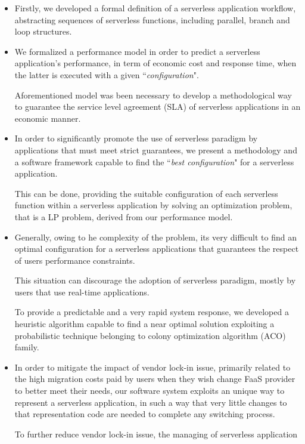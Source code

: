 \documentclass[12pt,a4paper]{report}
\begin{document}
\begin{itemize}
	\item Firstly, we developed a formal definition of a serverless application workflow, abstracting sequences of serverless functions, including parallel, branch and loop structures.
	
	\item We formalized a performance model in order to predict a serverless application's performance, in term of economic cost and response time, when the latter is executed with a given ``\textit{configuration}". 
	
	Aforementioned model was been necessary to develop a methodological way to guarantee the service level agreement (SLA) of serverless applications in an economic manner.
	
	\item In order to significantly promote the use of serverless paradigm by applications that must meet strict guarantees, we present a methodology and a software framework capable to find the ``\textit{best configuration}" for a serverless application.
	
	This can be done, providing the suitable configuration of each serverless function within a serverless application by solving an optimization problem, that is a LP problem, derived from our performance model.
	
	\item Generally, owing to he complexity of the problem, its very difficult to find an optimal configuration for a serverless applications that guarantees the respect of users performance constraints. 
	
	This situation can discourage the adoption of serverless paradigm, mostly by users that use real-time applications. 
	
	To provide a predictable and a very rapid system response, we developed a heuristic algorithm capable to find a near optimal solution exploiting a probabilistic technique belonging to colony optimization algorithm (ACO) family.  
	
	\item In order to mitigate the impact of vendor lock-in issue, primarily related to the high migration costs paid by users when they wish change FaaS provider to better meet their needs, our software system exploits an  unique way to represent a serverless application, in such a way that very little changes to that representation code are needed to complete any switching process.
	
	To further reduce vendor lock-in issue, the managing of serverless application 
	

\end{itemize}
\end{document}
